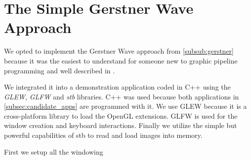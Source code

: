 \section{The Simple Gerstner Wave Approach}\label{sec:simple_gerstner_waves}


We opted to implement the Gerstner Wave approach from \autoref{subsub:gerstner}
because it was the easiest to understand for someone new to graphic pipeline
programming and well described in \autocite{fernando2004gpu}. 

We integrated it into a demonstration application coded in C++ using the
\textit{GLEW}, \textit{GLFW} and \textit{stb} libraries.  C++ was used because
both applications in \autoref{subsec:candidate_apps} are programmed with it. We
use GLEW because it is a cross-platform library to load the OpenGL extensions.
GLFW is used for the window creation and keyboard interactions. Finally we
utilize the simple but powerful capabilities of stb to read and load images into
memory.

First we setup all the windowing 


